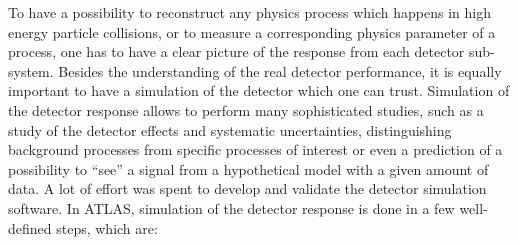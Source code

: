 To have a possibility to reconstruct any physics process which happens in high energy particle collisions, or to measure a corresponding physics parameter of a process,
one has to have a clear picture of the response from each detector sub-system. Besides the understanding of the real detector performance, it is equally important to have 
a simulation of the detector which one can trust. Simulation of the detector response allows to perform many sophisticated studies, such as a study of the detector effects and systematic uncertainties,
distinguishing background processes from specific processes of interest or even a prediction of a possibility to ``see'' a signal from a hypothetical model with a given amount of data.
A lot of effort was spent to develop and validate the detector simulation software. In ATLAS, simulation of the detector response is done in a few well-defined steps, which are:
